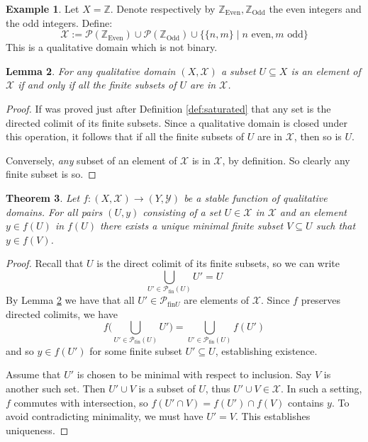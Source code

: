 \documentclass[12pt]{article}
\theoremstyle{plain}
\newtheorem{thm}{Theorem}[subsection] %
\newtheorem{lemma}[thm]{Lemma}
\theoremstyle{definition}
\newtheorem{example}[thm]{Example}
\newcommand{\bb}[1]{\mathbb{#1}}
\newcommand{\scr}[1]{\mathscr{#1}}
\newcommand{\call}[1]{\mathcal{#1}}
\newcommand{\lto}{\longrightarrow}
\begin{document}
	\begin{example}
		Let $X = \bb{Z}$. Denote respectively by $\bb{Z}_{\text{Even}}, \bb{Z}_{\text{Odd}}$ the even integers and the odd integers. Define:
		\begin{equation}
			\scr{X} := \call{P}(\bb{Z}_{\text{Even}}) \cup \call{P}(\bb{Z}_{\text{Odd}}) \cup \Big\{ \{ n, m \} \mid n\text{ even}, m\text{ odd}\Big\}
			\end{equation}
		This is a qualitative domain which is not binary.
		\end{example}
	\begin{lemma}\label{lem:finite_subsets}
		For any qualitative domain $(X,\scr{X})$ a subset $U \subseteq X$ is an element of $\scr{X}$ if and only if all the finite subsets of $U$ are in $\scr{X}$.
		\end{lemma}
	\begin{proof}
		If was proved just after Definition \ref{def:saturated} that any set is the directed colimit of its finite subsets. Since a qualitative domain is closed under this operation, it follows that if all the finite subsets of $U$ are in $\scr{X}$, then so is $U$.
		
		Conversely, \emph{any} subset of an element of $\scr{X}$ is in $\scr{X}$, by definition. So clearly any finite subset is so.
		\end{proof}
	
	\begin{thm}\label{thm:representation}
		Let $f: (X,\scr{X}) \lto (Y, \scr{Y})$ be a stable function of qualitative domains. For all pairs $(U, y)$ consisting of a set $U \in \scr{X}$ in $\scr{X}$ and an element $y \in f(U)$ in $f(U)$ there exists a unique minimal finite subset $V \subseteq U$ such that $y \in f(V)$.
		\end{thm}
	\begin{proof}
		Recall that $U$ is the direct colimit of its finite subsets, so we can write
		\begin{equation}
			\bigcup_{U' \in \call{P}_{\text{fin}}(U)}U' = U
			\end{equation}
		By Lemma \ref{lem:finite_subsets} we have that all $U' \in \call{P}_{\text{fin}U}$ are elements of $\scr{X}$. Since $f$ preserves directed colimits, we have
		\begin{equation}
			f\Big(\bigcup_{U' \in \call{P}_{\text{fin}}(U)}U'\Big) = \bigcup_{U' \in \call{P}_{\text{fin}}(U)}f(U')
			\end{equation}
		and so $y \in f(U')$ for some finite subset $U' \subseteq U$, establishing existence.
		
		Assume that $U'$ is chosen to be minimal with respect to inclusion. Say $V$ is another such set. Then $U' \cup V$ is a subset of $U$, thus $U' \cup V \in \scr{X}$. In such a setting, $f$ commutes with intersection, so $f(U' \cap V) = f(U') \cap f(V)$ contains $y$. To avoid contradicting minimality, we must have $U' = V$. This establishes uniqueness.
		\end{proof}
	
\end{document}
